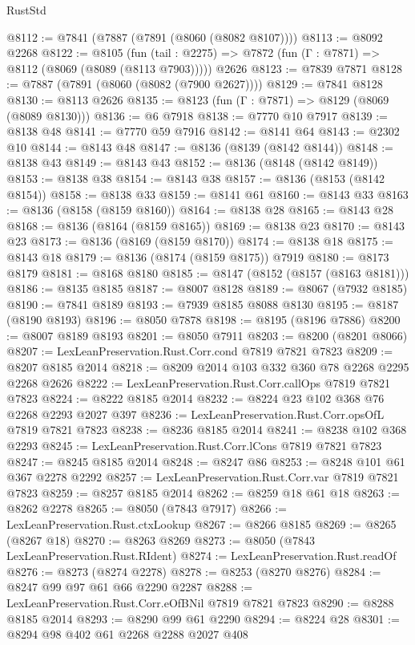 \begin{lexlean}{RustStd}
\begin{coremodule}
{\begin{coremodule}
{{{{{{{{{{{{{{{{{{{{{{{{{{{{{{{{{{{{{{{{{{{{{{{{{{{{{{@8112 := @7841 (@7887 (@7891 (@8060 (@8082 @8107))))
@8113 := @8092 @2268
@8122 := @8105
    (fun (tail : @2275) => @7872 (fun (Γ : @7871) => @8112 (@8069 (@8089 (@8113 @7903)))))
    @2626
@8123 := @7839 @7871
@8128 := @7887 (@7891 (@8060 (@8082 (@7900 @2627))))
@8129 := @7841 @8128
@8130 := @8113 @2626
@8135 := @8123 (fun (Γ : @7871) => @8129 (@8069 (@8089 @8130)))
@8136 := @6 @7918
@8138 := @7770 @10 @7917
@8139 := @8138 @48
@8141 := @7770 @59 @7916
@8142 := @8141 @64
@8143 := @2302 @10
@8144 := @8143 @48
@8147 := @8136 (@8139 (@8142 @8144))
@8148 := @8138 @43
@8149 := @8143 @43
@8152 := @8136 (@8148 (@8142 @8149))
@8153 := @8138 @38
@8154 := @8143 @38
@8157 := @8136 (@8153 (@8142 @8154))
@8158 := @8138 @33
@8159 := @8141 @61
@8160 := @8143 @33
@8163 := @8136 (@8158 (@8159 @8160))
@8164 := @8138 @28
@8165 := @8143 @28
@8168 := @8136 (@8164 (@8159 @8165))
@8169 := @8138 @23
@8170 := @8143 @23
@8173 := @8136 (@8169 (@8159 @8170))
@8174 := @8138 @18
@8175 := @8143 @18
@8179 := @8136 (@8174 (@8159 @8175)) @7919
@8180 := @8173 @8179
@8181 := @8168 @8180
@8185 := @8147 (@8152 (@8157 (@8163 @8181)))
@8186 := @8135 @8185
@8187 := @8007 @8128
@8189 := @8067 (@7932 @8185)
@8190 := @7841 @8189
@8193 := @7939 @8185 @8088 @8130
@8195 := @8187 (@8190 @8193)
@8196 := @8050 @7878
@8198 := @8195 (@8196 @7886)
@8200 := @8007 @8189 @8193
@8201 := @8050 @7911
@8203 := @8200 (@8201 @8066)
@8207 := LexLeanPreservation.Rust.Corr.cond @7819 @7821 @7823
@8209 := @8207 @8185 @2014
@8218 := @8209 @2014 @103 @332 @360 @78 @2268 @2295 @2268 @2626
@8222 := LexLeanPreservation.Rust.Corr.callOps @7819 @7821 @7823
@8224 := @8222 @8185 @2014
@8232 := @8224 @23 @102 @368 @76 @2268 @2293 @2027 @397
@8236 := LexLeanPreservation.Rust.Corr.opsOfL @7819 @7821 @7823
@8238 := @8236 @8185 @2014
@8241 := @8238 @102 @368 @2293
@8245 := LexLeanPreservation.Rust.Corr.lCons @7819 @7821 @7823
@8247 := @8245 @8185 @2014
@8248 := @8247 @86
@8253 := @8248 @101 @61 @367 @2278 @2292
@8257 := LexLeanPreservation.Rust.Corr.var @7819 @7821 @7823
@8259 := @8257 @8185 @2014
@8262 := @8259 @18 @61 @18
@8263 := @8262 @2278
@8265 := @8050 (@7843 @7917)
@8266 := LexLeanPreservation.Rust.ctxLookup
@8267 := @8266 @8185
@8269 := @8265 (@8267 @18)
@8270 := @8263 @8269
@8273 := @8050 (@7843 LexLeanPreservation.Rust.RIdent)
@8274 := LexLeanPreservation.Rust.readOf
@8276 := @8273 (@8274 @2278)
@8278 := @8253 (@8270 @8276)
@8284 := @8247 @99 @97 @61 @66 @2290 @2287
@8288 := LexLeanPreservation.Rust.Corr.eOfBNil @7819 @7821 @7823
@8290 := @8288 @8185 @2014
@8293 := @8290 @99 @61 @2290
@8294 := @8224 @28
@8301 := @8294 @98 @402 @61 @2268 @2288 @2027 @408
}}}}}}}}}}}}}}}}}}}}}}}}}}}}}}}}}}}}}}}}}}}}}}}}}}}}}}
\end{coremodule}}
\end{coremodule}
\end{lexlean}
